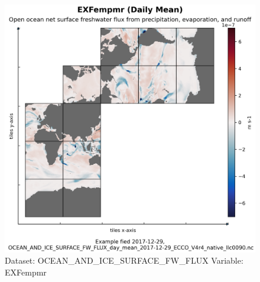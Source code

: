 \begin{figure}[H]
\centering
\includegraphics[scale=0.55]{../images/plots/native_plots/Ocean_and_Sea-Ice_Surface_Freshwater_Fluxes/EXFempmr.png}
\caption{Dataset: OCEAN\_AND\_ICE\_SURFACE\_FW\_FLUX Variable: EXFempmr}
\label{tab:table-OCEAN_AND_ICE_SURFACE_FW_FLUX_EXFempmr-Plot}
\end{figure}
\pagebreak
